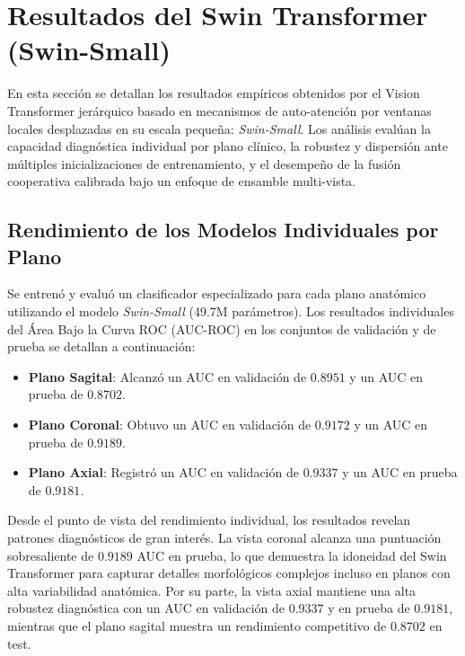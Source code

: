 \section{Resultados del Swin Transformer (Swin-Small)}
\label{sec:resultados_swin}

En esta sección se detallan los resultados empíricos obtenidos por el Vision Transformer jerárquico basado en mecanismos de auto-atención por ventanas locales desplazadas en su escala pequeña: \textit{Swin-Small}. Los análisis evalúan la capacidad diagnóstica individual por plano clínico, la robustez y dispersión ante múltiples inicializaciones de entrenamiento, y el desempeño de la fusión cooperativa calibrada bajo un enfoque de ensamble multi-vista.

\subsection{Rendimiento de los Modelos Individuales por Plano}
Se entrenó y evaluó un clasificador especializado para cada plano anatómico utilizando el modelo \textit{Swin-Small} (49.7M parámetros). Los resultados individuales del Área Bajo la Curva ROC (AUC-ROC) en los conjuntos de validación y de prueba se detallan a continuación:

\begin{itemize}
    \item \textbf{Plano Sagital}: Alcanzó un AUC en validación de $0.8951$ y un AUC en prueba de $0.8702$.
    \item \textbf{Plano Coronal}: Obtuvo un AUC en validación de $0.9172$ y un AUC en prueba de $0.9189$.
    \item \textbf{Plano Axial}: Registró un AUC en validación de $0.9337$ y un AUC en prueba de $0.9181$.
\end{itemize}

Desde el punto de vista del rendimiento individual, los resultados revelan patrones diagnósticos de gran interés. La vista coronal alcanza una puntuación sobresaliente de $0.9189$ AUC en prueba, lo que demuestra la idoneidad del Swin Transformer para capturar detalles morfológicos complejos incluso en planos con alta variabilidad anatómica. Por su parte, la vista axial mantiene una alta robustez diagnóstica con un AUC en validación de $0.9337$ y en prueba de $0.9181$, mientras que el plano sagital muestra un rendimiento competitivo de $0.8702$ en test.

